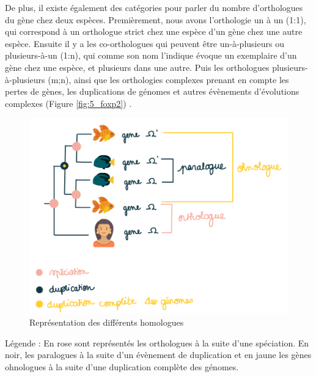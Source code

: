 \par De plus, il existe également des catégories pour parler du nombre d’orthologues du gène chez deux espèces. Premièrement, nous avons l’orthologie un à un (1:1), qui correspond à un orthologue strict chez une espèce d’un gène chez une autre espèce. Ensuite il y a les co-orthologues qui peuvent être un-à-plusieurs ou plusieurs-à-un (1:n), qui comme son nom l’indique évoque un exemplaire d’un gène chez une espèce, et plusieurs dans une autre. Puis les orthologues plusieurs-à-plusieurs (m;n), ainsi que les orthologies complexes prenant en compte les pertes de gènes, les duplications de génomes et autres évènements d’évolutions complexes (Figure \ref{fig:5_foxp2}) \parencite{koonin_orthologs_2005}.

\begin{figure}[H]
    \centering
    \includegraphics[width=1\textwidth]{figures/corps/figure6.png}
    \caption{Représentation des différents homologues}
    \label{fig:6_ortho}
\end{figure}
Légende : En rose sont représentés les orthologues à la suite d’une spéciation. En noir, les paralogues à la suite d’un évènement de duplication et en jaune les gènes ohnologues à la suite d’une duplication complète des génomes. 

